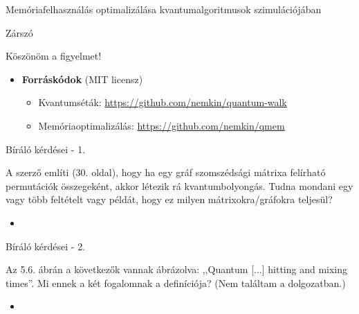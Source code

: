 \documentclass[aspectratio=169]{beamer}
\begin{document}
\begin{frame}{Memóriafelhasználás optimalizálása kvantumalgoritmusok szimulációjában}

\end{frame}

\begin{frame}{Zárszó}

\begin{center}
\begin{LARGE}
Köszönöm a figyelmet!
\end{LARGE}
\end{center}

\begin{itemize}
\item \textbf{Forráskódok} (MIT licensz)
\begin{itemize}
\item Kvantumséták: \href{https://github.com/nemkin/quantum-walk}{\color{blue}https://github.com/nemkin/quantum-walk}
\item Memóriaoptimalizálás: \href{https://github.com/nemkin/qmem}{\color{blue}https://github.com/nemkin/qmem}
\end{itemize}
\end{itemize}
\end{frame}

\begin{frame}{Bíráló kérdései - 1.}

A szerző említi (30. oldal), hogy ha egy gráf szomszédsági mátrixa felírható permutációk összegeként, akkor létezik rá kvantumbolyongás. Tudna mondani egy vagy több feltételt vagy példát, hogy ez milyen mátrixokra/gráfokra teljesül?

\begin{itemize}
  \item 
\end{itemize}

\end{frame}

\begin{frame}{Bíráló kérdései - 2.}

Az 5.6. ábrán a következők vannak ábrázolva: ,,Quantum [...] hitting and mixing times''. Mi ennek a két fogalomnak a definíciója? (Nem találtam a dolgozatban.)

\begin{itemize}
  \item 
\end{itemize}

\end{frame}
\end{document}
